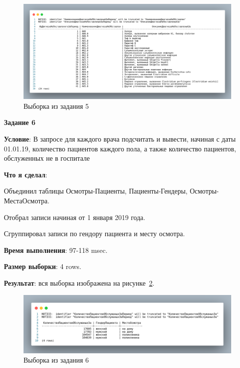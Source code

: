 \begin{figure}[!h]
  \centering

  \includegraphics[width=16cm]
  {../sql/task5/5-out.png}

  \caption{Выборка из задания 5}

  \label{fig:t5}
\end{figure}


\begin{center}
  \textbf{Задание 6}
\end{center}
  
\textbf{Условие}:
В запросе для каждого врача подсчитать и вывести, начиная с даты 01.01.19, количество
пациентов каждого пола, а также количество пациентов, обслуженных не в госпитале
  
\textbf{Что я сделал}:

Объединил таблицы Осмотры-Пациенты, Пациенты-Гендеры, Осмотры-МестаОсмотра.

Отобрал записи начиная от 1 января 2019 года.

Сгруппировал записи по гендору пациента и месту осмотра.



\textbf{Время выполнения}: 97-118 msec.

\textbf{Размер выборки}: 4 rows.

\textbf{Результат}: вся выборка изображена на рисунке~\ref{fig:t6}.

\begin{figure}[!h]
  \centering

  \includegraphics[width=16cm]
  {../sql/task6/6-out.png}

  \caption{Выборка из задания 6}

  \label{fig:t6}
\end{figure}

